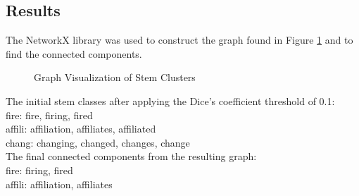 \subsection{Results}
The NetworkX library \cite{py:nx} was used to construct the graph found in Figure \ref{fig:graph} and to find the connected components.\\


\begin{figure}[h!]
\centering
\label{fig:graph}
\caption{Graph Visualization of Stem Clusters}
\end{figure}


The initial stem classes after applying the Dice's coefficient threshold of 0.1:\\

\noindent
fire: fire, firing, fired\\
affili: affiliation, affiliates, affiliated\\
chang: changing, changed, changes, change\\


The final connected components from the resulting graph:\\

\noindent
fire: firing, fired\\
affili: affiliation, affiliates\\
